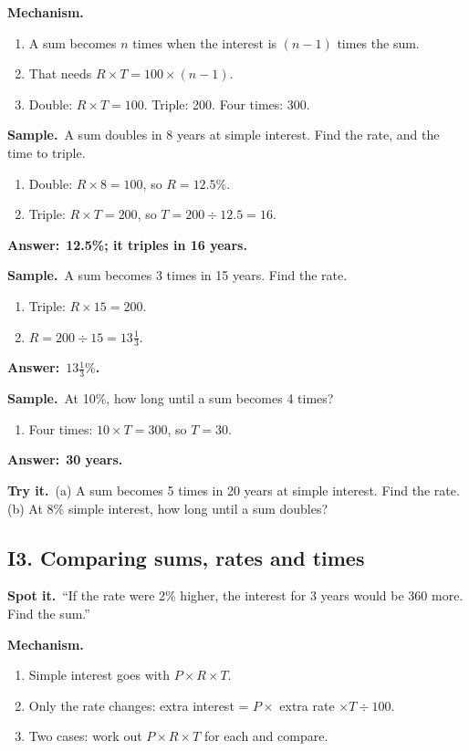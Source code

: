 \documentclass[11pt,a4paper]{article}
\let\oldsubsection\subsection
\renewcommand{\subsection}{\needspace{9\baselineskip}\oldsubsection}
\newcommand{\spot}{\textbf{\color{ember}Spot it.}\ }
\newcommand{\mech}{\textbf{\color{ember}Mechanism.}\ }
\newif\ifkeepsamp
\newcommand{\ans}[1]{\par\nopagebreak\noindent\textbf{\color{ember}Answer:}\ \textbf{#1}\par}
\newcommand{\samp}{\ifkeepsamp\needspace{4\baselineskip}\fi\textbf{\color{ember}Sample.}\ }
\newcommand{\tryit}[1]{\textbf{\color{ember}Try it.}\ #1}
\begin{document}
\mech
\begin{enumerate}
\item A sum becomes $n$ times when the interest is $(n - 1)$ times the sum.
\item That needs $R \times T = 100 \times (n - 1)$.
\item Double: $R \times T = 100$. Triple: 200. Four times: 300.
\end{enumerate}

\samp A sum doubles in 8 years at simple interest. Find the rate, and the time to triple.
\begin{enumerate}
\item Double: $R \times 8 = 100$, so $R = 12.5\%$.
\item Triple: $R \times T = 200$, so $T = 200 \div 12.5 = 16$.
\end{enumerate}
\ans{12.5\%; it triples in 16 years.}

\samp A sum becomes 3 times in 15 years. Find the rate.
\begin{enumerate}
\item Triple: $R \times 15 = 200$.
\item $R = 200 \div 15 = 13\tfrac13$.
\end{enumerate}
\ans{$13\tfrac13\%$.}

\samp At 10\%, how long until a sum becomes 4 times?
\begin{enumerate}
\item Four times: $10 \times T = 300$, so $T = 30$.
\end{enumerate}
\ans{30 years.}

\tryit (a) A sum becomes 5 times in 20 years at simple interest. Find the rate. (b) At 8\% simple interest, how long until a sum doubles?

\subsection{I3. Comparing sums, rates and times}
\spot ``If the rate were 2\% higher, the interest for 3 years would be 360 more. Find the sum.''

\mech
\begin{enumerate}
\item Simple interest goes with $P \times R \times T$.
\item Only the rate changes: extra interest = $P \times$ extra rate $\times T \div 100$.
\item Two cases: work out $P \times R \times T$ for each and compare.
\end{enumerate}
\end{document}
